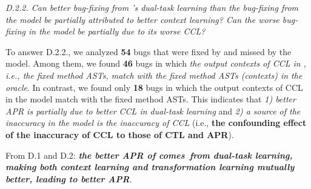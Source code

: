 
{\em D.2.2. Can better bug-fixing from {\tool}'s dual-task
  learning than the bug-fixing from the  model be
  partially attributed to better context learning? Can the worse bug-fixing in the  model be partially due to its worse CCL?}


To answer D.2.2., we analyzed {\bf 54} bugs that were fixed by
{\tool} and missed by the  model. Among them, we found
{\bf 46} bugs in which {\em the output contexts of CCL in {\tool},
  i.e., the fixed method ASTs, match with the fixed method ASTs
  (contexts) in the oracle}. In contrast, we found only {\bf 18} bugs
in which the output contexts of CCL in the  model
match with the fixed method ASTs.
%
This indicates that {\em 1) better APR is partially due to better
  CCL in dual-task learning} and {\em 2) a source
  of the inaccuracy in the  model is the inaccuracy of
  CCL} (i.e., {\bf the confounding effect of the inaccuracy of CCL to those of CTL and APR}).

From D.1 and D.2: {\bf {\em the better APR of {\tool}
    comes~from dual-task learning,
 making both context learning and transformation learning mutually
 better, leading to better APR}}.





